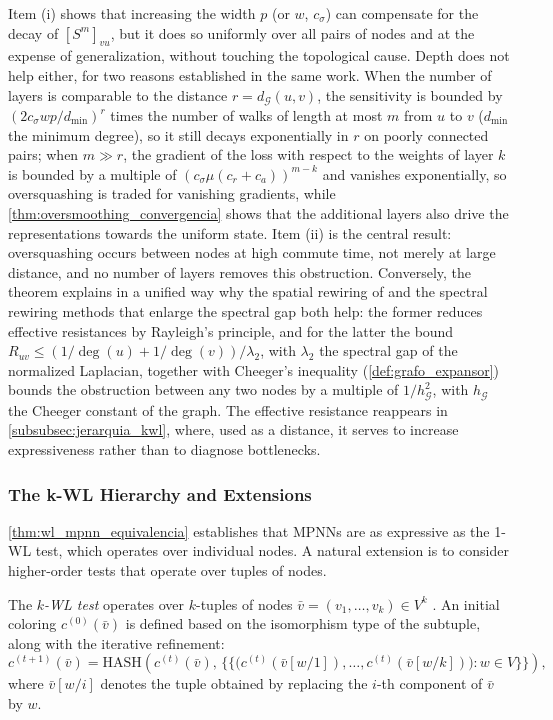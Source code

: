 Item (i) shows that increasing the width $p$ (or $w$, $c_\sigma$) can compensate for the decay of $[S^m]_{vu}$, but it does so uniformly over all pairs of nodes and at the expense of generalization, without touching the topological cause. Depth does not help either, for two reasons established in the same work. When the number of layers is comparable to the distance $r = d_{\mathcal{G}}(u,v)$, the sensitivity is bounded by $(2 c_\sigma w p / d_{\min})^{r}$ times the number of walks of length at most $m$ from $u$ to $v$ ($d_{\min}$ the minimum degree), so it still decays exponentially in $r$ on poorly connected pairs; when $m \gg r$, the gradient of the loss with respect to the weights of layer $k$ is bounded by a multiple of $(c_\sigma \mu (c_r + c_a))^{m-k}$ and vanishes exponentially, so \gls{oversquashing} is traded for vanishing gradients, while \autoref{thm:oversmoothing_convergencia} shows that the additional layers also drive the representations towards the uniform state. Item (ii) is the central result: \gls{oversquashing} occurs between nodes at high commute time, not merely at large distance, and no number of layers removes this obstruction. Conversely, the theorem explains in a unified way why the spatial rewiring of \citet{topping2022understanding} and the spectral rewiring methods that enlarge the spectral gap both help: the former reduces effective resistances by Rayleigh's principle, and for the latter the bound $R_{uv} \leq (1/\deg(u) + 1/\deg(v))/\lambda_2$, with $\lambda_2$ the spectral gap of the normalized Laplacian, together with Cheeger's inequality (\autoref{def:grafo_expansor}) bounds the obstruction between any two nodes by a multiple of $1/h_{\mathcal{G}}^2$, with $h_{\mathcal{G}}$ the Cheeger constant of the graph. The effective resistance reappears in \autoref{subsubsec:jerarquia_kwl}, where, used as a distance, it serves to increase expressiveness rather than to diagnose bottlenecks.

\subsubsection{The k-WL Hierarchy and Extensions}\label{subsubsec:jerarquia_kwl}

\autoref{thm:wl_mpnn_equivalencia} establishes that \glspl{MPNN} are as expressive as the 1-WL test, which operates over individual nodes. A natural extension is to consider higher-order tests that operate over tuples of nodes.

\begin{definition}\label{def:k_wl}
	The \textit{$k$-\gls{WL} test} operates over $k$-tuples of nodes $\bar{v} = (v_1, \ldots, v_k) \in V^k$ \citep{morris2019weisfeiler}. An initial coloring $c^{(0)}(\bar{v})$ is defined based on the isomorphism type of the subtuple, along with the iterative refinement:
	\[
		c^{(t+1)}(\bar{v}) = \mathrm{HASH}\!\left(c^{(t)}(\bar{v}),\, \bigl\{\!\!\bigl\{ \bigl(c^{(t)}(\bar{v}[w/1]), \ldots, c^{(t)}(\bar{v}[w/k])\bigr) : w \in V \bigr\}\!\!\bigr\}\right),
	\]
	where $\bar{v}[w/i]$ denotes the tuple obtained by replacing the $i$-th component of $\bar{v}$ by $w$.
\end{definition}


